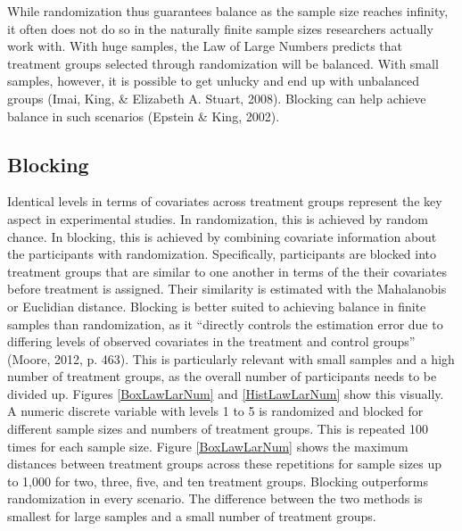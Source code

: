 \documentclass[12pt,econ]{sources/authesis}
\begin{document}
While randomization thus guarantees balance as the sample size reaches infinity, it often does not do so in the naturally finite sample sizes researchers actually work with. With huge samples, the Law of Large Numbers predicts that treatment groups selected through randomization will be balanced. With small samples, however, it is possible to get unlucky and end up with unbalanced groups (Imai, King, \& Elizabeth A. Stuart, 2008). Blocking can help achieve balance in such scenarios (Epstein \& King, 2002).

\hypertarget{ordblock-theory-blocking}{%
\subsection{Blocking}\label{ordblock-theory-blocking}}

Identical levels in terms of covariates across treatment groups represent the key aspect in experimental studies. In randomization, this is achieved by random chance. In blocking, this is achieved by combining covariate information about the participants with randomization. Specifically, participants are blocked into treatment groups that are similar to one another in terms of the their covariates before treatment is assigned. Their similarity is estimated with the Mahalanobis or Euclidian distance. Blocking is better suited to achieving balance in finite samples than randomization, as it ``directly controls the estimation error due to differing levels of observed covariates in the treatment and control groups'' (Moore, 2012, p. 463). This is particularly relevant with small samples and a high number of treatment groups, as the overall number of participants needs to be divided up. Figures \ref{BoxLawLarNum} and \ref{HistLawLarNum} show this visually. A numeric discrete variable with levels 1 to 5 is randomized and blocked for different sample sizes and numbers of treatment groups. This is repeated 100 times for each sample size. Figure \ref{BoxLawLarNum} shows the maximum distances between treatment groups across these repetitions for sample sizes up to 1,000 for two, three, five, and ten treatment groups. Blocking outperforms randomization in every scenario. The difference between the two methods is smallest for large samples and a small number of treatment groups.
\end{document}
